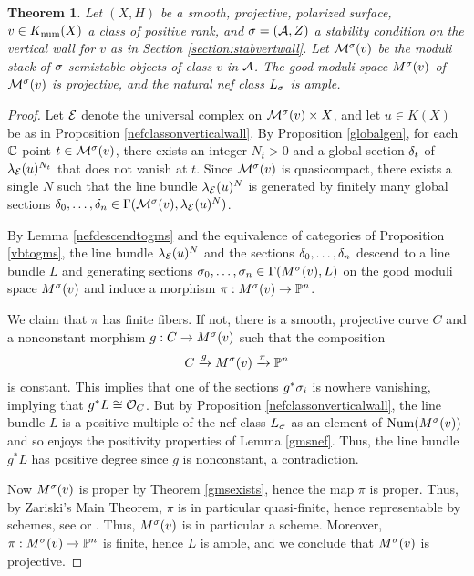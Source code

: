 \documentclass[letterpaper,11pt]{amsart}%
\newtheorem{thm}{Theorem}[section]
\theoremstyle{remark}
\begin{document}
\begin{thm}\label{projectivity}
    Let $(X, H)$ be a smooth, projective, polarized surface, $v \in K_{\mathrm{num}}(X)$ a class of positive rank, and $\sigma = (\mathcal{A}, Z)$ a stability condition on the vertical wall for $v$ as in Section \ref{section:stabvertwall}. Let $\mathcal{M}^\sigma(v)$ be the moduli stack of $\sigma$-semistable objects of class $v$ in $\mathcal{A}$. The good moduli space $M^\sigma(v)$ of $\mathcal{M}^\sigma(v)$ is projective, and the natural nef class $L_\sigma$ is ample.
\end{thm}
\begin{proof}
    Let $\mathcal{E}$ denote the universal complex on $\mathcal{M}^\sigma(v) \times X$, and let $u \in K(X)$ be as in Proposition \ref{nefclassonverticalwall}. By Proposition \ref{globalgen}, for each $\mathbb{C}$-point $t \in \mathcal{M}^\sigma(v)$, there exists an integer $N_t > 0$ and a global section $\delta_t$ of $\lambda_{\mathcal{E}}(u)^{N_t}$ that does not vanish at $t$. Since $\mathcal{M}^\sigma(v)$ is quasicompact, there exists a single $N$ such that the line bundle $\lambda_{\mathcal{E}}(u)^N$ is generated by finitely many global sections $\delta_0,\ldots,\delta_n \in \Gamma(\mathcal{M}^\sigma(v), \lambda_{\mathcal{E}}(u)^N)$. 
    
    By Lemma \ref{nefdescendtogms} and the equivalence of categories of Proposition \ref{vbtogms}, the line bundle $\lambda_{\mathcal{E}}(u)^N$ and the sections $\delta_0,\ldots,\delta_n$ descend to a line bundle $L$ and generating sections $\sigma_0,\ldots,\sigma_n \in \Gamma(M^\sigma(v), L)$ on the good moduli space $M^\sigma(v)$ and induce a morphism $\pi: M^\sigma(v) \to \mathbb{P}^n$.
    
    We claim that $\pi$ has finite fibers. If not, there is a smooth, projective curve $C$ and a nonconstant morphism $g: C \to M^\sigma(v)$ such that the composition 
    \[ C \xrightarrow{g} M^\sigma(v) \xrightarrow{\pi} \mathbb{P}^n \]
    is constant. This implies that one of the sections $g^*\sigma_i$ is nowhere vanishing, implying that $g^*L \cong \mathcal{O}_C$. But by Proposition \ref{nefclassonverticalwall}, the line bundle $L$ is a positive multiple of the nef class $L_\sigma$ as an element of $\mathrm{Num}(M^\sigma(v))$ and so enjoys the positivity properties of Lemma \ref{gmsnef}. Thus, the line bundle $g^*L$ has positive degree since $g$ is nonconstant, a contradiction.
    
    Now $M^\sigma(v)$ is proper by Theorem \ref{gmsexists}, hence the map $\pi$ is proper. Thus, by Zariski's Main Theorem, $\pi$ is in particular quasi-finite, hence representable by schemes, see \cite[Chapter II, Theorem 6.15]{knutson} or \cite[\href{https://stacks.math.columbia.edu/tag/082J}{Tag 082J}]{stacks-project}. Thus, $M^\sigma(v)$ is in particular a scheme. Moreover, $\pi: M^\sigma(v) \to \mathbb{P}^n$ is finite, hence $L$ is ample, and we conclude that $M^\sigma(v)$ is projective.
\end{proof}
\end{document}
